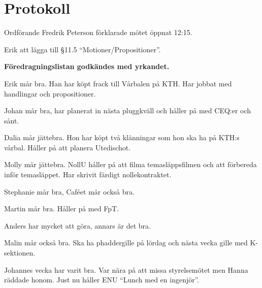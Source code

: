 \documentclass[10pt]{article}
\def\mo{Fredrik Peterson}
\begin{document}
\section*{Protokoll}
\begin{paragrafer}
Ordförande {\mo} förklarade mötet öppnat 12:15.

\valavmo

\valavms

\tosg

\ingaadj

\valavj

Erik \ypa att lägga till \S11.5 ``Motioner/Propositioner''.

\textbf{Föredragningslistan godkändes med yrkandet.}


\begin{fyllnadsval} %
\end{fyllnadsval}

\begin{paragrafer}
Erik mår bra. Han har köpt frack till Vårbalen på KTH. Har jobbat med handlingar och propositioner.

Johan mår bra, har planerat in nästa pluggkväll och håller på med CEQ:er och sånt.

Dalia mår jättebra. Hon har köpt två klänningar som hon ska ha på KTH:s vårbal. Håller på att planera Utedischot.

Molly mår jättebra. NollU håller på att filma temasläppsfilmen och att förbereda inför temasläppet. Har skrivit färdigt nollekontraktet.

Stephanie mår bra, Caféet mår också bra.

Martin mår bra. Håller på med FpT.

Anders har mycket att göra, annars är det bra.

Malin mår också bra. Ska ha phaddergille på lördag och nästa vecka gille med K-sektionen.

Johannes vecka har varit bra. Var nära på att missa styrelsemötet men Hanna räddade honom. Just nu håller ENU ``Lunch med en ingenjör''.


\end{paragrafer}
\end{paragrafer}
\end{document}
